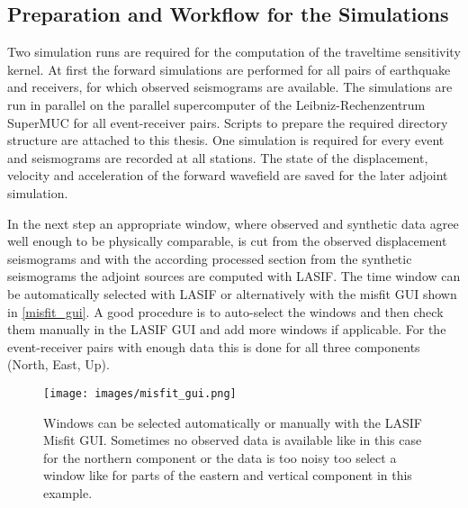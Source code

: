 \subsection{Preparation and Workflow for the Simulations}



Two simulation runs are required for the computation of the traveltime sensitivity kernel.
%
At first the forward simulations are performed for all pairs of earthquake and receivers, for which observed seismograms are available.
The simulations are run in parallel on the parallel supercomputer of the Leibniz-Rechenzentrum SuperMUC for all event-receiver pairs. 
Scripts to prepare the required directory structure are attached to this thesis. %
One simulation is required for every event and seismograms are recorded at all stations. 
The state of the displacement, velocity and acceleration of the forward wavefield are saved for the later adjoint simulation.

In the next step an appropriate window, where observed and synthetic data agree well enough to be physically comparable,
is cut from the observed displacement seismograms and with the according processed section from the synthetic seismograms 
the adjoint sources are computed with LASIF.
The time window can be automatically selected with LASIF or alternatively with the misfit GUI shown in \autoref{misfit_gui}.
%
A good procedure is to auto-select the windows and then check them manually in the LASIF GUI and 
add more windows if applicable.
For the event-receiver pairs with enough data this is done for all three components (North, East, Up).

\begin{figure}[h]
\begin{center}
\texttt{[image: images/misfit\_gui.png]}
\caption[The LASIF Misfit GUI.]{Windows can be selected automatically or manually with the LASIF Misfit GUI.
Sometimes no observed data is available like in this case for the northern component
or the data is too noisy too select a window like for parts of the eastern and vertical component in this example.}
\label{misfit_gui}
\end{center}
\end{figure}

